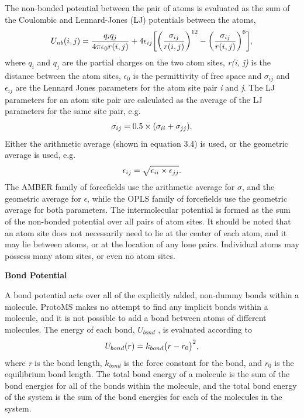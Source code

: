 \documentclass[letterpaper,10pt,english]{sphinxmanual}
\begin{document}
The non-bonded potential between the pair of atoms is evaluated as the sum of the Coulombic and Lennard-Jones (LJ) potentials between the atoms,
\begin{gather}
\begin{split}U_{nb}(i,j) = \frac{q_i q_j}{4\pi\epsilon_{0} r(i,j)} + 4\epsilon_{ij}\biggl[ \biggl(\frac{\sigma_{ij}}{r(i,j)}\biggr)^{12} - \biggl(\frac{\sigma_{ij}}{r(i,j)}\biggr)^6 \biggr],\end{split}\notag
\end{gather}
where \(q_i\) and \(q_j\) are the partial charges on the two atom sites, \emph{r(i, j)} is the distance between the atom sites, \(\epsilon_0\) is the permittivity of free space and \(\sigma_{ij}\) and \(\epsilon_{ij}\) are the Lennard Jones parameters for the atom site pair \emph{i} and \emph{j}. The LJ parameters for an atom site pair are calculated as the average of the LJ parameters for the same site pair, e.g.
\begin{gather}
\begin{split}\sigma_{ij} = 0.5\times(\sigma_{ii} + \sigma_{jj}).\end{split}\notag
\end{gather}
Either the arithmetic average (shown in equation 3.4) is used, or the geometric average is used, e.g.
\begin{gather}
\begin{split}\epsilon_{ij} = \sqrt{\epsilon_{ii}\times\epsilon_{jj}}.\end{split}\notag
\end{gather}
The AMBER family of forcefields use the arithmetic average for \(\sigma\), and the geometric average for \(\epsilon\), while the OPLS family of forcefields use the geometric average for both parameters. The intermolecular potential is formed as the sum of the non-bonded potential over all pairs of atom sites. It should be noted that an atom site does not necessarily need to lie at the center of each atom, and it may lie between atoms, or at the location of any lone pairs. Individual atoms may possess many atom sites, or even no atom sites.

\textbf{Bond Potential}

A bond potential acts over all of the explicitly added, non-dummy bonds within a molecule. ProtoMS makes no attempt to find any implicit bonds within a molecule, and it is not possible to add a bond between atoms of different molecules. The energy of each bond, \(U_{bond}\) , is evaluated according to
\begin{gather}
\begin{split}U_{bond}(r) = k_{bond}\bigl(r-r_0\bigr)^2,\end{split}\notag
\end{gather}
where \emph{r} is the bond length, \(k_{bond}\) is the force constant for the bond, and \(r_0\) is the equilibrium bond length. The total bond energy of a molecule is the sum of the bond energies for all of the bonds within the molecule, and the total bond energy of the system is the sum of the bond energies for each of the molecules in the system.
\end{document}
